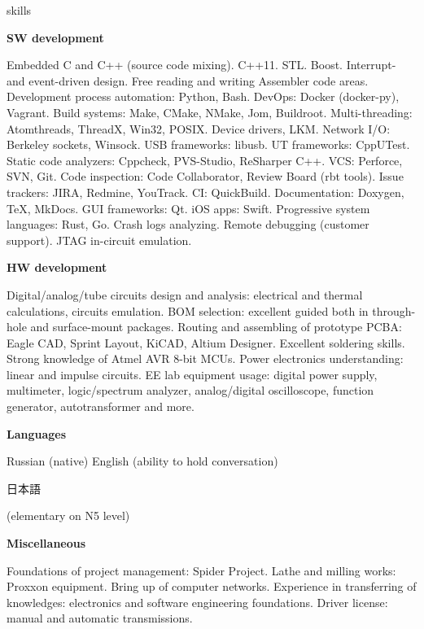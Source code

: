 \documentclass{template}
\begin{document}

\begin{rSection}{skills}
\begin{rItemize}

\item \textbf{SW development}

      Embedded C and C++ (source code mixing). C++11. STL. Boost. Interrupt- and event-driven design. Free reading and writing Assembler code
      areas. Development process automation: Python, Bash. DevOps: Docker (docker-py), Vagrant. Build systems: Make, CMake, NMake, Jom, Buildroot.
      Multi-threading: Atomthreads, ThreadX, Win32, POSIX. Device drivers, LKM. Network I/O: Berkeley sockets, Winsock. USB frameworks: libusb. UT
      frameworks: CppUTest. Static code analyzers: Cppcheck, PVS-Studio, ReSharper C++. VCS: Perforce, SVN, Git. Code inspection: Code Collaborator,
      Review Board (rbt tools). Issue trackers: JIRA, Redmine, YouTrack. CI: QuickBuild. Documentation: Doxygen, \TeX, MkDocs. GUI frameworks: Qt.
      iOS apps: Swift. Progressive system languages: Rust, Go. Crash logs analyzing. Remote debugging (customer support). JTAG in-circuit emulation.

\item \textbf{HW development}

      Digital/analog/tube circuits design and analysis: electrical and thermal calculations, circuits emulation. BOM selection: excellent guided
      both in through-hole and surface-mount packages. Routing and assembling of prototype PCBA: Eagle CAD, Sprint Layout, KiCAD,
      Altium Designer. Excellent soldering skills. Strong knowledge of Atmel AVR 8-bit MCUs. Power electronics understanding: linear and
      impulse circuits. EE lab equipment usage: digital power supply, multimeter, logic/spectrum analyzer, analog/digital oscilloscope, function
      generator, autotransformer and more.

\item \textbf{Languages}

      Russian (native) \newline
      English (ability to hold conversation) \newline
      \begin{CJK}{UTF8}{min}日本語\end{CJK} (elementary on N5 level)

\item \textbf{Miscellaneous}

      Foundations of project management: Spider Project. Lathe and milling works: Proxxon equipment. Bring up of computer networks.
      Experience in transferring of knowledges: electronics and software engineering foundations. Driver license: manual and automatic
      transmissions.

\end{rItemize}
\end{rSection}
\end{document}
